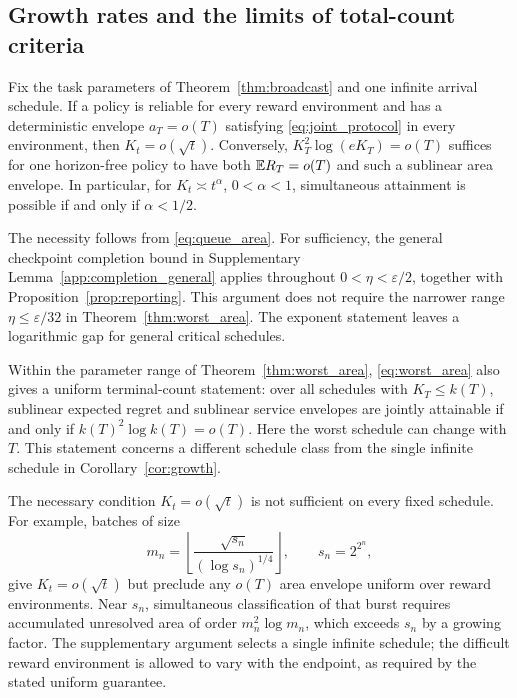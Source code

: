 \documentclass[11pt]{article}
\begin{document}
\subsection{Growth rates and the limits of total-count criteria}

\begin{corollary}
\label{cor:growth}
Fix the task parameters of Theorem~\ref{thm:broadcast} and one infinite arrival
schedule. If a policy is reliable for every reward environment and has a
deterministic envelope $a_T=o(T)$ satisfying \eqref{eq:joint_protocol} in
every environment, then $K_t=o(\sqrt t)$. Conversely,
$K_T^2\log(eK_T)=o(T)$ suffices for one horizon-free policy to have both
$\mathbb E R_T=o(T)$ and such a sublinear area envelope. In particular, for
$K_t\asymp t^\alpha$, $0<\alpha<1$, simultaneous attainment is possible if
and only if $\alpha<1/2$.
\end{corollary}

The necessity follows from \eqref{eq:queue_area}. For sufficiency, the general
checkpoint completion bound in Supplementary Lemma~\ref{app:completion_general}
applies throughout $0<\eta<\varepsilon/2$, together with
Proposition~\ref{prop:reporting}. This argument does not require the narrower
range $\eta\le\varepsilon/32$ in Theorem~\ref{thm:worst_area}. The exponent
statement leaves a logarithmic gap for general critical schedules.

Within the parameter range of Theorem~\ref{thm:worst_area},
\eqref{eq:worst_area} also gives a uniform terminal-count statement: over all
schedules with $K_T\le k(T)$, sublinear expected regret and sublinear service
envelopes are jointly attainable if and only if
$k(T)^2\log k(T)=o(T)$. Here the worst schedule can change with $T$.
This statement concerns a different schedule class from the single infinite
schedule in Corollary~\ref{cor:growth}.

The necessary condition $K_t=o(\sqrt t)$ is not sufficient on every fixed
schedule. For example, batches of size
\[
 m_n=\left\lfloor\frac{\sqrt{s_n}}{(\log s_n)^{1/4}}\right\rfloor,
 \qquad s_n=2^{2^n},
\]
give $K_t=o(\sqrt t)$ but preclude any $o(T)$ area envelope uniform over
reward environments. Near $s_n$, simultaneous classification of that burst
requires accumulated unresolved area of order $m_n^2\log m_n$, which exceeds
$s_n$ by a growing factor. The supplementary argument selects a single
infinite schedule; the difficult reward environment is allowed to vary with
the endpoint, as required by the stated uniform guarantee.
\end{document}
